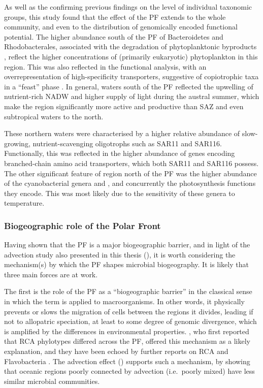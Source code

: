 As well as the confirming previous findings on the level of individual taxonomic groups, this study found that the effect of the \ac{PF} extends to the whole community, and even to the distribution of genomically encoded functional potential.
The higher abundance south of the \ac{PF} of Bacteroidetes and Rhodobacterales, associated with the degradation of phytoplanktonic byproducts \citep[e.g.][]{Buchan:2005hd,Williams:2012gsa}, reflect the higher concentrations of (primarily eukaryotic) phytoplankton in this region. 
This was also reflected in the functional analysis, with an overrepresentation of high-specificity transporters, suggestive of copiotrophic taxa in a ``feast'' phase \cite{Lauro:2009gx}.
In general, waters south of the \ac{PF} reflected the upwelling of nutrient-rich \ac{NADW} and higher supply of light during the austral summer, which make the region significantly more active and productive than \ac{SAZ} and even subtropical waters to the north.

These northern waters were characterised by a higher relative abundance of slow-growing, nutrient-scavenging oligotrophs such as SAR11 and SAR116.
Functionally, this was reflected in the higher abundance of genes encoding branched-chain amino acid transporters, which both SAR11 and SAR116 possess.
The other significant feature of region north of the \ac{PF} was the higher abundance of the cyanobacterial genera  and , and concurrently the photosynthesis functions they encode.
This was most likely due to the sensitivity of these genera to temperature.

\subsubsection{Biogeographic role of the Polar Front}

Having shown that the \ac{PF} is a major biogeographic barrier, and in light of the advection study also presented in this thesis (), it is worth considering the mechanism(s) by which the \ac{PF} shapes microbial biogeography.
It is likely that three main forces are at work.

The first is the role of the \ac{PF} as a ``biogeographic barrier'' in the classical sense in which the term is applied to macroorganisms.
In other words, it physically prevents or slows the migration of cells between the regions it divides, leading if not to allopatric speciation, at least to some degree of genomic divergence, which is amplified by the differences in environmental properties.
\citet{Selje:2004ka}, who first reported that \ac{RCA} phylotypes differed across the \ac{PF}, offered this mechanism as a likely explanation, and they have been echoed by further reports on RCA \cite{Giebel:2009hr} and Flavobacteria \cite{Abell:2005ji}.
The advection effect () supports such a mechanism, by showing that oceanic regions poorly connected by advection (i.e.\ poorly mixed) have less similar microbial communities.

